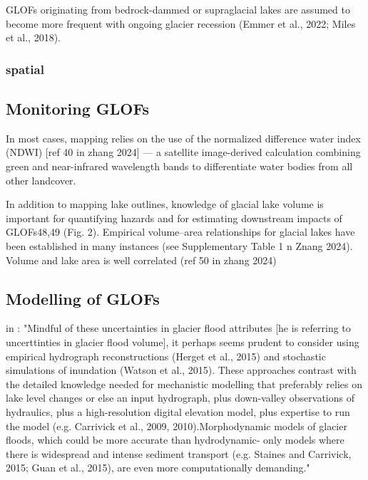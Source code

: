 GLOFs originating from bedrock-dammed or supraglacial lakes are assumed to become more frequent with ongoing glacier recession (Emmer et al., 2022; Miles et al., 2018).





\subsubsection{spatial}

\subsection{Monitoring GLOFs}%

In most cases, mapping relies on the use of the normalized difference water index (NDWI) [ref 40 in zhang 2024] — a satellite image-derived calculation combining green and near-infrared wavelength bands to differentiate water bodies from all other landcover.

In addition to mapping lake outlines, knowledge of glacial lake volume is important for quantifying hazards and for estimating downstream impacts of GLOFs48,49 (Fig. 2). Empirical volume–area relationships for glacial lakes have been established in many instances (see Supplementary Table 1 n Znang 2024). 
Volume and lake area is well correlated (ref 50 in zhang 2024)

\subsection{Modelling of GLOFs}

in \cite{Carrivick&Tweed2016}: "Mindful of these uncertainties in glacier flood attributes [he is referring to uncerttinties in glacier flood volume], it perhaps
seems prudent to consider using empirical hydrograph reconstructions
(Herget et al., 2015) and stochastic simulations of inundation (Watson
et al., 2015). These approaches contrast with the detailed knowledge
needed for mechanistic modelling that preferably relies on lake level
changes or else an input hydrograph, plus down-valley observations
of hydraulics, plus a high-resolution digital elevation model, plus expertise
to run the model (e.g. Carrivick et al., 2009, 2010).Morphodynamic
models of glacier floods, which could be more accurate than hydrodynamic-
only models where there is widespread and intense sediment
transport (e.g. Staines and Carrivick, 2015; Guan et al., 2015), are even
more computationally demanding."

